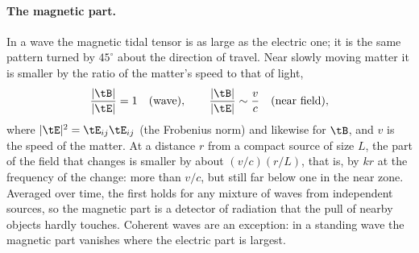 \paragraph{The magnetic part.} In a wave the magnetic tidal tensor is as large
as the electric one; it is the same pattern turned by $45^\circ$ about the
direction of travel. Near slowly moving matter it is smaller by the ratio of
the matter's speed to that of light,
\begin{equation}\label{eq:magnetic-ratio}
\frac{|\tB|}{|\tE|} = 1 \quad\text{(wave)},
\qquad
\frac{|\tB|}{|\tE|} \sim \frac{v}{c} \quad\text{(near field)} ,
\end{equation}
where $|\tE|^2 = \tE_{ij}\tE_{ij}$ (the Frobenius norm) and likewise for $\tB$,
and $v$ is the speed of the matter. At a distance $r$ from a compact source of
size $L$, the part of the field that changes is smaller by about $(v/c)(r/L)$,
that is, by $kr$ at the frequency of the change: more than $v/c$, but still far
below one in the near zone.
Averaged over time, the first holds for any mixture of waves from independent
sources, so the magnetic part is a detector of radiation that the pull of
nearby objects hardly touches. Coherent waves are an exception: in a standing
wave the magnetic part vanishes where the electric part is largest.

